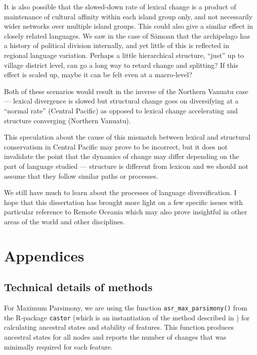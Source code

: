 \documentclass[draft,10pt]{article} %
\begin{document}
It is also possible that the slowed-down rate of lexical change is a product of maintenance of cultural affinity within each island group only, and not necessarily wider networks over multiple island groups. This could also give a similar effect in closely related languages. We saw in the case of S\={a}moan that the archipelago has a history of political division internally, and yet little of this is reflected in regional language variation. Perhaps a little hierarchical structure, ``just'' up to village district level, can go a long way to retard change and splitting? If this effect is scaled up, maybe it can be felt even at a macro-level?

Both of these scenarios would result in the inverse of the Northern Vanuatu case --- lexical divergence is slowed but structural change goes on diversifying at a ``normal rate'' (Central Pacific) as opposed to lexical change accelerating and structure converging (Northern Vanuatu).

This speculation about the cause of this mismatch between lexical and structural conservatism in Central Pacific may prove to be incorrect, but it does not invalidate the point that the dynamics of change may differ depending on the part of language studied --- structure is different from lexicon and we should not assume that they follow similar paths or processes. 

We still have much to learn about the processes of language diversification. I hope that this dissertation has brought more light on a few specific issues with particular reference to Remote Oceania which may also prove insightful in other areas of the world and other disciplines.

\newpage
\singlespacing




\newpage
\singlespacing
\appendix
\section*{Appendices}
\renewcommand{\thesubsection}{\Alph{subsection}}

\subsection{Technical details of methods}
\label{supp:tech_details}

For Maximum Parsimony, we are using the function \texttt{asr\_max\_parsimony()} from the R-package \texttt{castor} \citep{louca2017efficient} (which is an instantiation of the method described in \citet{sankoff1975minimal}) for calculating ancestral states and stability of features. This function produces ancestral states for all nodes and reports the number of changes that was minimally required for each feature. 
\end{document}
